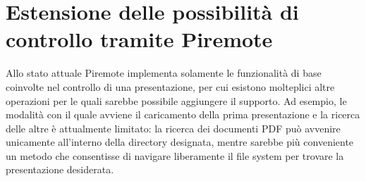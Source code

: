 \section{Estensione delle possibilità di controllo tramite Piremote}
Allo stato attuale Piremote implementa solamente le funzionalità di base coinvolte nel controllo di una presentazione, per cui esistono molteplici altre operazioni per le quali sarebbe possibile aggiungere il supporto. Ad esempio, le modalità con il quale avviene il caricamento della prima presentazione e la ricerca delle altre è attualmente limitato: la ricerca dei documenti PDF può avvenire unicamente all'interno della directory designata, mentre sarebbe più conveniente un metodo che consentisse di navigare liberamente il file system per trovare la presentazione desiderata. 
